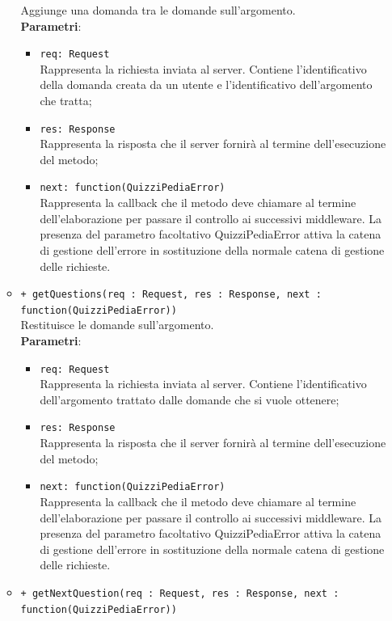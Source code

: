\begin{itemize}
\begin{itemize}
			Aggiunge una domanda tra le domande sull'argomento.  \\
			\textbf{Parametri}:
			\begin{itemize}
			\item \texttt{req: Request} \\
			Rappresenta la richiesta inviata al server. Contiene l'identificativo della domanda creata da un utente e l'identificativo dell'argomento che tratta;
			\item \texttt{res: Response} \\
			Rappresenta la risposta che il server fornirà al termine dell'esecuzione del metodo;
			\item \texttt{next: function(QuizziPediaError)} \\
			Rappresenta la callback che il metodo deve chiamare al termine dell'elaborazione per passare il controllo ai successivi middleware. La presenza del parametro facoltativo QuizziPediaError attiva la catena di gestione dell'errore in sostituzione della normale catena di gestione delle richieste.
			\end{itemize}
			\item \texttt{+ getQuestions(req : Request, res : Response, next : function(QuizziPediaError))} \\
			Restituisce le domande sull'argomento.  \\
			\textbf{Parametri}:
			\begin{itemize}
			\item \texttt{req: Request} \\
			Rappresenta la richiesta inviata al server. Contiene l'identificativo dell'argomento trattato dalle domande che si vuole ottenere;
			\item \texttt{res: Response} \\
			Rappresenta la risposta che il server fornirà al termine dell'esecuzione del metodo;
			\item \texttt{next: function(QuizziPediaError)} \\
			Rappresenta la callback che il metodo deve chiamare al termine dell'elaborazione per passare il controllo ai successivi middleware. La presenza del parametro facoltativo QuizziPediaError attiva la catena di gestione dell'errore in sostituzione della normale catena di gestione delle richieste.
			\end{itemize}
			\item \texttt{+ getNextQuestion(req : Request, res : Response, next : function(QuizziPediaError))} \\

\end{itemize}
\end{itemize}

